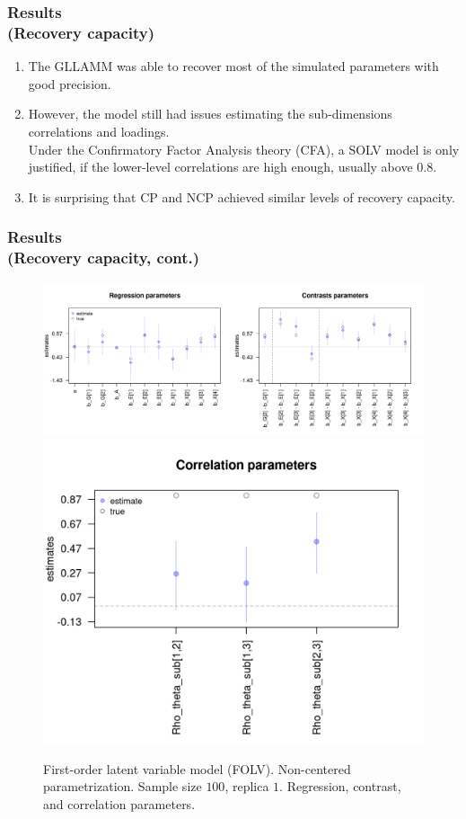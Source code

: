 \documentclass[nonav,sleutel]{beamer}
\begin{document}
	\begin{frame}
		\frametitle{Results \\
			(Recovery capacity)}
		\begin{enumerate}
			\item The GLLAMM was able to recover most of the simulated parameters with good precision.
			\item However, the model still had issues estimating the sub-dimensions correlations and loadings.\\
			\vspace{0.3cm} Under the Confirmatory Factor Analysis theory (CFA), a SOLV model is only justified, if the lower-level correlations are high enough, usually above 0.8.
			\item It is surprising that CP and NCP achieved similar levels of recovery capacity.
		\end{enumerate} 
	\end{frame}
	\begin{frame}
		\frametitle{Results \\
			(Recovery capacity, cont.)}
		\begin{figure}[H]
			\centering
			\includegraphics[width=0.65\linewidth]{FOLV_NC_J100_Ndata1_regression}
			\includegraphics[width=0.35\linewidth]{FOLV_NC_J100_Ndata1_corr}
			\caption{First-order latent variable model (FOLV). Non-centered parametrization. Sample size $100$, replica $1$. Regression, contrast, and correlation parameters.}
			\label{fig:FOLV_NC_recovery1}
		\end{figure} 
	\end{frame}
\end{document}
